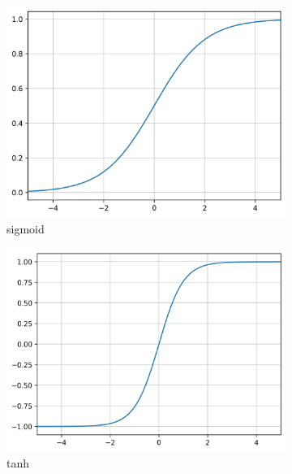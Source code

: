  \begin{figure}[htpb]
  \centering
  \begin{subfigure}[b]{0.29\textwidth}
    \includegraphics[width=\textwidth]{./parts/ch4-asr/img/sigmoid.png}
    \caption{sigmoid}
    \label{fig:asr:acoustic:dnn:activation:sigmoid}
  \end{subfigure}
  \begin{subfigure}[b]{0.3\textwidth}
    \includegraphics[width=\textwidth]{./parts/ch4-asr/img/tanh.png}
    \caption{tanh}
    \label{fig:asr:acoustic:dnn:activation:tanh}
  \end{subfigure}
  \begin{subfigure}[b]{0.28\textwidth}

\end{subfigure}
\end{figure}
